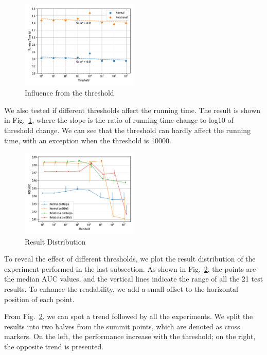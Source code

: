 \documentclass[5p]{elsarticle}
\begin{document}
	\begin{figure}[!htb]
		\centering
		\includegraphics[width=0.5\textwidth]{img/Scalability.Threshold.pdf}
		\caption{Influence from the threshold}\label{fig:Scalability.Threshold}
	\end{figure}

	We also tested if different thresholds affect the running time. The result is shown in Fig.~\ref{fig:Scalability.Threshold}, where the slope is the ratio of running time change to log10 of threshold change. We can see that the threshold can hardly affect the running time, with an exception when the threshold is 10000.

	\begin{figure}[!htb]
		\centering
		\includegraphics[width=0.5\textwidth]{img/Distribution.pdf}
		\caption{Result Distribution}\label{fig:Distribution}
	\end{figure}

	To reveal the effect of different thresholds, we plot the result distribution of the experiment performed in the last subsection. As shown in Fig.~\ref{fig:Distribution}, the points are the median AUC values, and the vertical lines indicate the range of all the 21 test results. To enhance the readability, we add a small offset to the horizontal position of each point.

	From Fig.~\ref{fig:Distribution}, we can spot a trend followed by all the experiments. We split the results into two halves from the summit points, which are denoted as cross markers. On the left, the performance increase with the threshold; on the right, the opposite trend is presented.
\end{document}
